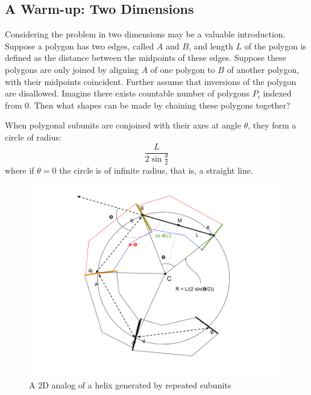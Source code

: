 \documentclass[mathematics,article,submit,pdftex,moreauthors]{Definitions/mdpi}
\begin{document}
\subsection{A Warm-up: Two Dimensions}

Considering the problem in two dimensions may be a valuable introduction.
Suppose a polygon has two edges, called $A$ and $B$, and length $L$ of the
polygon is defined as the distance between the midpoints of these edges.
Suppose these
polygons are only joined by aligning $A$ of one polygon to $B$ of another polygon, with their midpoints coincident. Further assume that inversions of the polygon are disallowed.  Imagine there exists
countable number of polygons $P_i$ indexed from $0$. Then what shapes can be made by chaining these
polygons together?

\begin{Theorem}
  When polygonal subunits are conjoined with their axes at angle $\theta$, they form a
  circle of radius:
  \[
\frac{L}{2 \sin{\frac{\theta}{2}}}
\]
where if $\theta = 0$ the circle is of infinite radius, that is, a straight line.
  \end{Theorem}
\begin{figure}
  \centering
  \captionsetup{justification=centering}
     \includegraphics[width=10.5 cm]{figures/2DPolygonStacking.png}
     \caption{A 2D analog of a helix generated by repeated subunits}
  \label{fig:prismdiagram}
\end{figure}
\unskip
\end{document}

